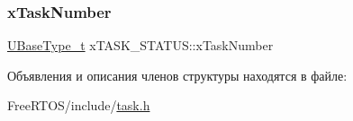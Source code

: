\mbox{\label{structx_t_a_s_k___s_t_a_t_u_s_acd44468ba37270b04f83d0833c098057}} 
\subsubsection{\texorpdfstring{xTaskNumber}{xTaskNumber}}
{\footnotesize\ttfamily \mbox{\hyperlink{portmacro_8h_a646f89d4298e4f5afd522202b11cb2e6}{U\+Base\+Type\+\_\+t}} x\+T\+A\+S\+K\+\_\+\+S\+T\+A\+T\+U\+S\+::x\+Task\+Number}



Объявления и описания членов структуры находятся в файле\+:\begin{DoxyCompactItemize}
\item 
Free\+R\+T\+O\+S/include/\mbox{\hyperlink{task_8h}{task.\+h}}\end{DoxyCompactItemize}
